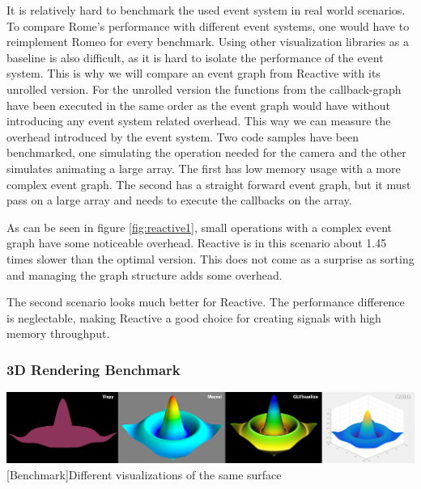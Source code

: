 It is relatively hard to benchmark the used event system in real world scenarios. To compare Rome's performance with different event systems, one would have to reimplement Romeo for every benchmark.
Using other visualization libraries as a baseline is also difficult, as it is hard to isolate the performance of the event system.
This is why we will compare an event graph from Reactive with its unrolled version.
For the unrolled version the functions from the callback-graph have been executed in the same order as the event graph would have without introducing any event system related overhead.
This way we can measure the overhead introduced by the event system.
Two code samples have been benchmarked, one simulating the operation needed for the camera and the other simulates animating a large array.
The first has low memory usage with a more complex event graph. The second has a straight forward event graph, but it must pass on a large array and needs to execute the callbacks on the array.

As can be seen in figure \ref{fig:reactive1}, small operations with a complex event graph have some noticeable overhead. Reactive is in this scenario about 1.45 times slower than the optimal version.
This does not come as a surprise as sorting and managing the graph structure adds some overhead.

The second scenario looks much better for Reactive. The performance difference is neglectable, making Reactive a good choice for creating signals with high memory throughput.

\subsubsection{3D Rendering Benchmark}

\begin{minipage}{\linewidth}
    \centering
    \includegraphics[width=\linewidth]{graphics/vispy_mayavi_romeo.jpg}
    [Benchmark]{Different visualizations of the same surface}
    \label{fig:reactive1}
\end{minipage}

